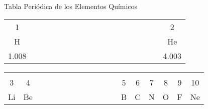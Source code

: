 \begin{infocard}{Tabla Periódica de los Elementos Químicos}
    \begin{center}
        \begin{tabular}{|c|p{10.7mm}*{14}{p{9.86mm}}p{12.2mm}|c|}
            \cline{1-1}\cline{18-18}
            {\small 1}                                &  &  &  &  &  &  &  &  &  &  &  &  &  &  &  &  & \small 2                                   \\[-1mm]
            H                                         &  &  &  &  &  &  &  &  &  &  &  &  &  &  &  &  & He                                         \\[-2mm]
            \small \hspace{1.6mm}1.008\hspace{1.65mm} &  &  &  &  &  &  &  &  &  &  &  &  &  &  &  &  & \small \hspace{1.55mm}4.003\hspace{2.25mm} \\\cline{1-2}\cline{13-18}
        \end{tabular}
        \begin{tabular}{|c|c|p{17.8mm}*{9}{p{8.98mm}}|c|c|c|c|c|c|}
                                                       &                                             &  &  &  &  &  &  &  &  &  &  &                                            &                                             &                                           &               &                                           &               \\[-6.6mm]
            \small 3                                   & \small 4                                    &  &  &  &  &  &  &  &  &  &  & \small 5                                   & \small 6                                    & \small 7                                  & \small 8      & \small 9                                  & \small 10     \\[-1mm]
            Li                                         & Be                                          &  &  &  &  &  &  &  &  &  &  & B                                          & C                                           & N                                         & O             & F                                         & Ne            \\[-2mm]

\end{tabular}
\end{center}
\end{infocard}
